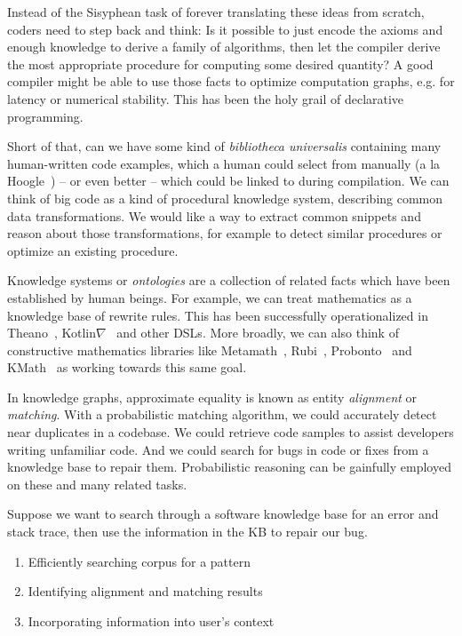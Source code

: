 \documentclass[11pt]{article}
\begin{document}
    Instead of the Sisyphean task of forever translating these ideas from scratch, coders need to step back and think: Is it possible to just encode the axioms and enough knowledge to derive a family of algorithms, then let the compiler derive the most appropriate procedure for computing some desired quantity? A good compiler might be able to use those facts to optimize computation graphs, e.g. for latency or numerical stability. This has been the holy grail of declarative programming.

    Short of that, can we have some kind of \textit{bibliotheca universalis} containing many human-written code examples, which a human could select from manually (a la Hoogle~\citep{james2020digging}) -- or even better -- which could be linked to during compilation. We can think of big code as a kind of procedural knowledge system, describing common data transformations. We would like a way to extract common snippets and reason about those transformations, for example to detect similar procedures or optimize an existing procedure.

    Knowledge systems or \textit{ontologies} are a collection of related facts which have been established by human beings. For example, we can treat mathematics as a knowledge base of rewrite rules. This has been successfully operationalized in Theano~\citep{bergstra2010theano}, Kotlin$\nabla$~\citep{considine2019kotlingrad} and other DSLs. More broadly, we can also think of constructive mathematics libraries like Metamath~\citep{megill2006metamath}, Rubi~\citep{rich2009knowledge}, Probonto~\citep{swat2016probonto} and KMath~\citep{nozik2019kotlin} as working towards this same goal.

    In knowledge graphs, approximate equality is known as entity \textit{alignment} or \textit{matching}. With a probabilistic matching algorithm, we could accurately detect near duplicates in a codebase. We could retrieve code samples to assist developers writing unfamiliar code. And we could search for bugs in code or fixes from a knowledge base to repair them. Probabilistic reasoning can be gainfully employed on these and many related tasks.

    Suppose we want to search through a software knowledge base for an error and stack trace, then use the information in the KB to repair our bug.

    \begin{enumerate}
        \item Efficiently searching corpus for a pattern
        \item Identifying alignment and matching results
        \item Incorporating information into user's context
    \end{enumerate}
\end{document}
